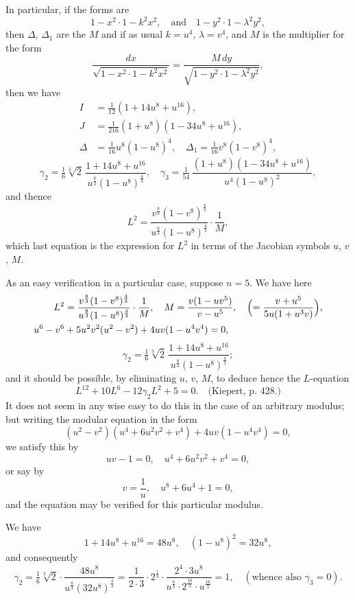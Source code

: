 \documentclass[11pt,a4paper]{book}
\begin{document}
In particular, if the forms are
\[1 - x^2 \cdot 1 - k^2x^2, \quad \text{and} \quad 1 - y^2 \cdot 1 - \lambda^2 y^2,\]
then $\Delta$, $\Delta_1$ are the $M$ and if as usual $k = u^4$, $\lambda = v^4$, and $M$ is the multiplier for the form
\[
\frac{dx}{\sqrt{1 - x^2 \cdot 1 - k^2x^2}} = \frac{M\,dy}{\sqrt{1 - y^2 \cdot 1 - \lambda^2y^2}},
\]
then we have
\begin{align*}
I &= \tfrac{1}{12}(1 + 14u^8 + u^{16}), \\
J &= \tfrac{1}{216}(1 + u^8)(1 - 34u^8 + u^{16}), \\
\Delta &= \tfrac{1}{16}u^8(1 - u^8)^4, \quad \Delta_1 = \tfrac{1}{16}v^8(1 - v^8)^4,
\end{align*}
\[
\gamma_2 = \tfrac{1}{6}\sqrt[3]{2}\, \frac{1 + 14u^8 + u^{16}}{u^{\frac{8}{3}}(1 - u^8)^{\frac{4}{3}}}, \quad
\gamma_3 = \tfrac{1}{54}\, \frac{(1 + u^8)(1 - 34u^8 + u^{16})}{u^4(1 - u^8)^2},
\]
and thence
\[L^2 = \frac{v^{\frac{8}{3}}(1 - v^8)^{\frac{4}{3}}}{u^{\frac{8}{3}}(1 - u^8)^{\frac{4}{3}}} \cdot \frac{1}{M},\]
which last equation is the expression for $L^2$ in terms of the Jacobian symbols $u$, $v$, $M$.

As an easy verification in a particular case, suppose $n = 5$. We have here
\begin{align*}
L^2 &= \frac{v^{\frac{8}{3}}(1 - v^8)^{\frac{4}{3}}}{u^{\frac{8}{3}}(1 - u^8)^{\frac{4}{3}}} \cdot \frac{1}{M}, \quad
M = \frac{v(1 - uv^5)}{v - u^5}, \quad \Bigl(= \frac{v + u^5}{5u(1 + u^3v)}\Bigr), \\
u^6 - v^6 &+ 5u^2v^2(u^2 - v^2) + 4uv(1 - u^4v^4) = 0,
\end{align*}
\[\gamma_2 = \tfrac{1}{6}\sqrt[3]{2}\, \frac{1 + 14u^8 + u^{16}}{u^{\frac{8}{3}}(1 - u^8)^{\frac{4}{3}}};\]
and it should be possible, by eliminating $u$, $v$, $M$, to deduce hence the $L$-equation
\[L^{12} + 10L^6 - 12\gamma_2 L^2 + 5 = 0. \quad \text{(Kiepert, p.~428.)}\]
It does not seem in any wise easy to do this in the case of an arbitrary modulus; but writing the modular equation in the form
\[(u^2 - v^2)(u^4 + 6u^2v^2 + v^4) + 4uv(1 - u^4v^4) = 0,\]
we satisfy this by
\[uv - 1 = 0, \quad u^4 + 6u^2v^2 + v^4 = 0,\]
or say by
\[v = \frac{1}{u}, \quad u^8 + 6u^4 + 1 = 0,\]
and the equation may be verified for this particular modulus.

We have
\[1 + 14u^8 + u^{16} = 48u^8, \quad (1 - u^8)^2 = 32u^8,\]
and consequently
\[\gamma_2 = \tfrac{1}{6}\sqrt[3]{2} \cdot \frac{48u^8}{u^{\frac{8}{3}}(32u^8)^{\frac{4}{3}}} = \frac{1}{2 \cdot 3} \cdot 2^{\frac{1}{3}} \cdot \frac{2^4 \cdot 3u^8}{u^{\frac{8}{3}} \cdot 2^{\frac{10}{3}} \cdot u^{\frac{16}{3}}} = 1, \quad (\text{whence also } \gamma_3 = 0).\]
\end{document}
